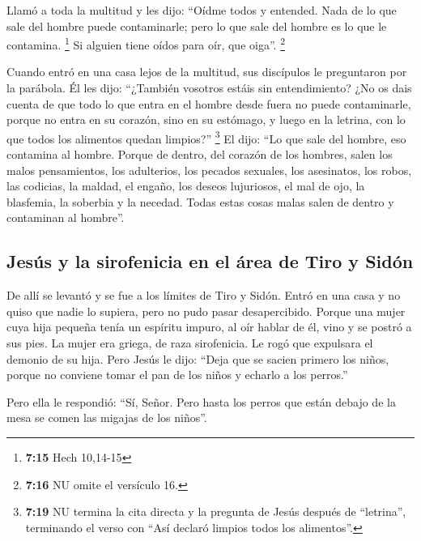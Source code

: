 \begin{paracol}{2}
 Llamó a toda la multitud y les dijo: ``Oídme todos y
entended.  Nada de lo que sale del hombre puede
contaminarle; pero lo que sale del hombre es lo que le contamina.
\footnote{\textbf{7:15} Hech 10,14-15}  Si alguien tiene
oídos para oír, que oiga''. \footnote{\textbf{7:16} NU omite el
  versículo 16.}

 Cuando entró en una casa lejos de la multitud, sus
discípulos le preguntaron por la parábola.  Él les dijo:
``¿También vosotros estáis sin entendimiento? ¿No os dais cuenta de que
todo lo que entra en el hombre desde fuera no puede contaminarle,
 porque no entra en su corazón, sino en su estómago, y
luego en la letrina, con lo que todos los alimentos quedan limpios?''
\footnote{\textbf{7:19} NU termina la cita directa y la pregunta de
  Jesús después de ``letrina'', terminando el verso con ``Así declaró
  limpios todos los alimentos''.}  El dijo: ``Lo que sale
del hombre, eso contamina al hombre.  Porque de dentro,
del corazón de los hombres, salen los malos pensamientos, los
adulterios, los pecados sexuales, los asesinatos, los robos,
 las codicias, la maldad, el engaño, los deseos
lujuriosos, el mal de ojo, la blasfemia, la soberbia y la necedad.
 Todas estas cosas malas salen de dentro y contaminan al
hombre''.

\hypertarget{jesuxfas-y-la-sirofenicia-en-el-uxe1rea-de-tiro-y-siduxf3n}{%
\subsection{Jesús y la sirofenicia en el área de Tiro y
Sidón}\label{jesuxfas-y-la-sirofenicia-en-el-uxe1rea-de-tiro-y-siduxf3n}}

 De allí se levantó y se fue a los límites de Tiro y
Sidón. Entró en una casa y no quiso que nadie lo supiera, pero no pudo
pasar desapercibido.  Porque una mujer cuya hija pequeña
tenía un espíritu impuro, al oír hablar de él, vino y se postró a sus
pies.  La mujer era griega, de raza sirofenicia. Le rogó
que expulsara el demonio de su hija.  Pero Jesús le dijo:
``Deja que se sacien primero los niños, porque no conviene tomar el pan
de los niños y echarlo a los perros.''

 Pero ella le respondió: ``Sí, Señor. Pero hasta los
perros que están debajo de la mesa se comen las migajas de los niños''.


\end{paracol}
